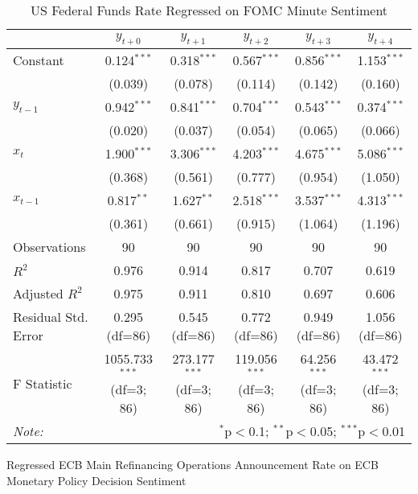 \documentclass[12pt, letterpaper]{article}
\begin{document}
\begin{table}[H] \centering
  \caption{US Federal Funds Rate Regressed on FOMC Minute Sentiment}
  \begin{adjustbox}{width=\textwidth}
\begin{tabular}{lccccc}
\hline
\hline
 & $y_{t+0}$ & $y_{t+1}$ & $y_{t+2}$ & $y_{t+3}$ & $y_{t+4}$  \\
\hline
 Constant & 0.124$^{***}$ & 0.318$^{***}$ & 0.567$^{***}$ & 0.856$^{***}$ & 1.153$^{***}$ \\
& (0.039) & (0.078) & (0.114) & (0.142) & (0.160) \\
 $y_{t-1}$ & 0.942$^{***}$ & 0.841$^{***}$ & 0.704$^{***}$ & 0.543$^{***}$ & 0.374$^{***}$ \\
& (0.020) & (0.037) & (0.054) & (0.065) & (0.066) \\
 $x_{t}$ & 1.900$^{***}$ & 3.306$^{***}$ & 4.203$^{***}$ & 4.675$^{***}$ & 5.086$^{***}$ \\
& (0.368) & (0.561) & (0.777) & (0.954) & (1.050) \\
 $x_{t-1}$ & 0.817$^{**}$ & 1.627$^{**}$ & 2.518$^{***}$ & 3.537$^{***}$ & 4.313$^{***}$ \\
& (0.361) & (0.661) & (0.915) & (1.064) & (1.196) \\
\hline
 Observations & 90 & 90 & 90 & 90 & 90 \\
 $R^2$ & 0.976 & 0.914 & 0.817 & 0.707 & 0.619 \\
 Adjusted $R^2$ & 0.975 & 0.911 & 0.810 & 0.697 & 0.606 \\
 Residual Std. Error & 0.295 (df=86) & 0.545 (df=86) & 0.772 (df=86) & 0.949 (df=86) & 1.056 (df=86) \\
 F Statistic & 1055.733$^{***}$ (df=3; 86) & 273.177$^{***}$ (df=3; 86) & 119.056$^{***}$ (df=3; 86) & 64.256$^{***}$ (df=3; 86) & 43.472$^{***}$ (df=3; 86) \\
\hline
\hline
\textit{Note:} & \multicolumn{5}{r}{$^{*}$p$<$0.1; $^{**}$p$<$0.05; $^{***}$p$<$0.01} \\
\end{tabular}
\end{adjustbox}
\end{table}

 Regressed ECB Main Refinancing Operations Announcement Rate on ECB Monetary Policy Decision Sentiment
\end{document}
